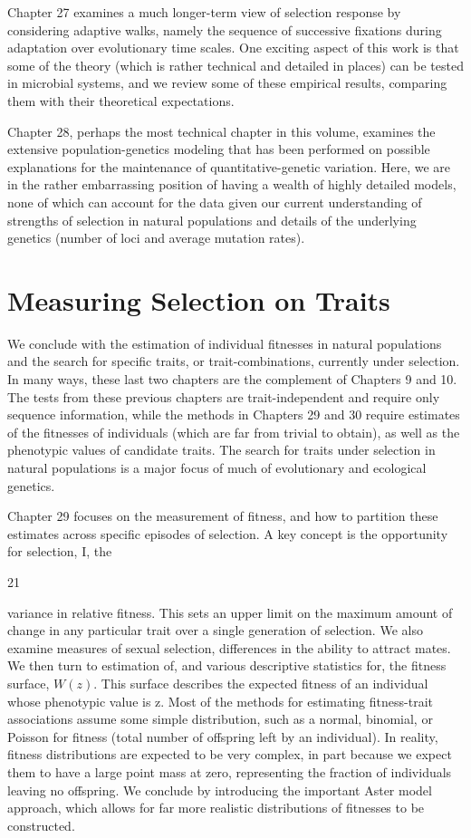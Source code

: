 \documentclass{article}
\begin{document}
Chapter 27 examines a much longer-term view of selection response by considering adaptive walks, namely the sequence of successive fixations during adaptation over evolutionary time scales. One exciting aspect of this work is that some of the theory (which is rather technical and detailed in places) can be tested in microbial systems, and we review some of these empirical results, comparing them with their theoretical expectations.

Chapter 28, perhaps the most technical chapter in this volume, examines the extensive population-genetics modeling that has been performed on possible explanations for the maintenance of quantitative-genetic variation. Here, we are in the rather embarrassing position of having a wealth of highly detailed models, none of which can account for the data given our current understanding of strengths of selection in natural populations and details of the underlying genetics (number of loci and average mutation rates).

\section{Measuring Selection on Traits}
We conclude with the estimation of individual fitnesses in natural populations and the search for specific traits, or trait-combinations, currently under selection. In many ways, these last two chapters are the complement of Chapters 9 and 10. The tests from these previous chapters are trait-independent and require only sequence information, while the methods in Chapters 29 and 30 require estimates of the fitnesses of individuals (which are far from trivial to obtain), as well as the phenotypic values of candidate traits. The search for traits under selection in natural populations is a major focus of much of evolutionary and ecological genetics.

Chapter 29 focuses on the measurement of fitness, and how to partition these estimates across specific episodes of selection. A key concept is the opportunity for selection, I, the

21

variance in relative fitness. This sets an upper limit on the maximum amount of change in any particular trait over a single generation of selection. We also examine measures of sexual selection, differences in the ability to attract mates. We then turn to estimation of, and various descriptive statistics for, the fitness surface,  $ W(z) $. This surface describes the expected fitness of an individual whose phenotypic value is z. Most of the methods for estimating fitness-trait associations assume some simple distribution, such as a normal, binomial, or Poisson for fitness (total number of offspring left by an individual). In reality, fitness distributions are expected to be very complex, in part because we expect them to have a large point mass at zero, representing the fraction of individuals leaving no offspring. We conclude by introducing the important Aster model approach, which allows for far more realistic distributions of fitnesses to be constructed.
\end{document}
